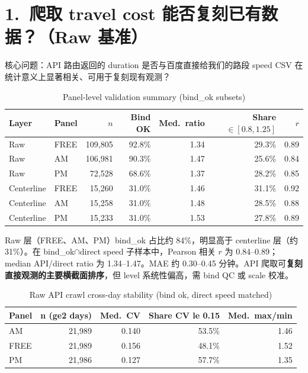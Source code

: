 \documentclass[12pt]{article}
\begin{document}
\section*{1.\ 爬取 travel cost 能否复刻已有数据？（Raw 基准）}

核心问题：API 路由返回的 duration 是否与百度直接给我们的路段 speed CSV 在统计意义上显著相关、可用于复刻现有观测？

\begin{table}[h!]
\centering
\caption{Panel-level validation summary (bind\_ok subsets)}
\label{tab:panel_summary}
\footnotesize
\setlength{\tabcolsep}{3pt}
\begin{tabular}{llrrrrr}
\toprule
Layer & Panel & $n$ & Bind OK & Med.\ ratio & Share $\in [0.8,1.25]$ & $r$ \\
\midrule
Raw & FREE & 109,805 & 92.8\% & 1.34 & 29.3\% & 0.89 \\
Raw & AM & 106,981 & 90.3\% & 1.47 & 25.6\% & 0.84 \\
Raw & PM & 72,528 & 68.6\% & 1.37 & 28.2\% & 0.85 \\
Centerline & FREE & 15,260 & 31.0\% & 1.46 & 31.1\% & 0.92 \\
Centerline & AM & 15,258 & 31.0\% & 1.48 & 28.5\% & 0.88 \\
Centerline & PM & 15,233 & 31.0\% & 1.53 & 27.8\% & 0.89 \\
\bottomrule
\end{tabular}
\end{table}

Raw 层（FREE、AM、PM）bind\_ok 占比约 84\%，明显高于 centerline 层（约 31\%）。在 bind\_ok$\cap$direct speed 子样本中，Pearson 相关 $r$ 为 0.84--0.89；median API/direct ratio 为 1.34--1.47。MAE 约 0.30--0.45 分钟。API 爬取可\textbf{复刻直接观测的主要横截面排序}，但 level 系统性偏高，需 bind QC 或 scale 校准。

\begin{table}[h!]
\centering
\caption{Raw API crawl cross-day stability (bind ok, direct speed matched)}
\label{tab:raw_stability}
\footnotesize
\begin{tabular}{lrrrr}
\toprule
Panel & n (ge2 days) & Med.\ CV & Share CV le 0.15 & Med.\ max/min \\
\midrule
AM & 21,989 & 0.140 & 53.5\% & 1.46 \\
FREE & 21,989 & 0.156 & 48.1\% & 1.52 \\
PM & 21,986 & 0.127 & 57.7\% & 1.35 \\
\bottomrule
\end{tabular}
\end{table}
\end{document}
